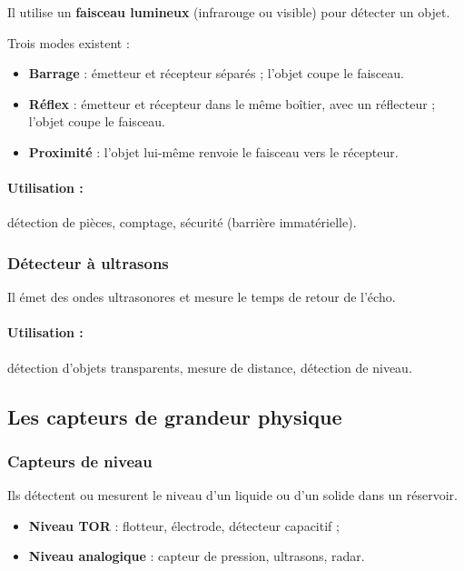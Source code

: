 Il utilise un \textbf{faisceau lumineux} (infrarouge ou visible) pour détecter un objet.

Trois modes existent :

\begin{itemize}
    \item \textbf{Barrage} : émetteur et récepteur séparés ; l'objet coupe le faisceau.
    \item \textbf{Réflex} : émetteur et récepteur dans le même boîtier, avec un réflecteur ; l'objet coupe le faisceau.
    \item \textbf{Proximité} : l'objet lui-même renvoie le faisceau vers le récepteur.
\end{itemize}

\paragraph{Utilisation :} détection de pièces, comptage, sécurité (barrière immatérielle).

\subsubsection{Détecteur à ultrasons}

Il émet des ondes ultrasonores et mesure le temps de retour de l'écho.

\paragraph{Utilisation :} détection d'objets transparents, mesure de distance, détection de niveau.

\subsection{Les capteurs de grandeur physique}

\subsubsection{Capteurs de niveau}

Ils détectent ou mesurent le niveau d'un liquide ou d'un solide dans un réservoir.

\begin{itemize}
    \item \textbf{Niveau TOR} : flotteur, électrode, détecteur capacitif ;
    \item \textbf{Niveau analogique} : capteur de pression, ultrasons, radar.
\end{itemize}

